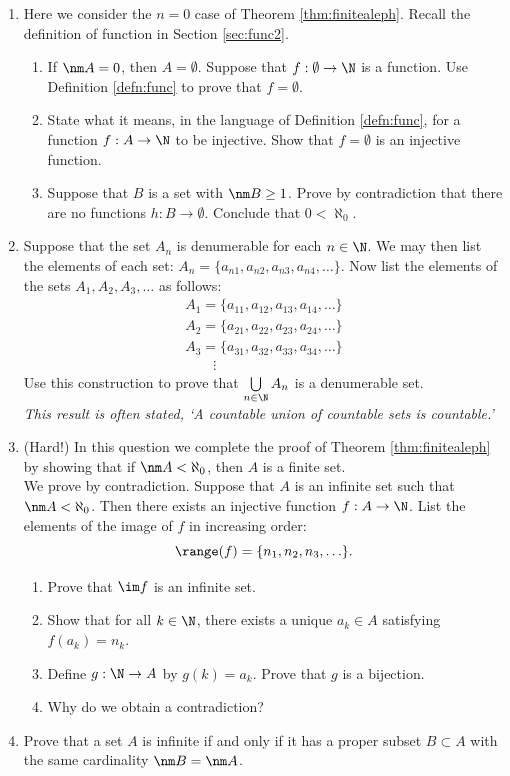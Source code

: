 \begin{enumerate}
	\item Here we consider the $n=0$ case of Theorem \ref{thm:finitealeph}. Recall the definition of function in Section \ref{sec:func2}.
  \begin{enumerate}
    \item If $\nm A=0$, then $A=\emptyset$. Suppose that $f:\emptyset\to\N$ is a function. Use Definition \ref{defn:func} to prove that $f=\emptyset$.
    \item State what it means, in the language of Definition \ref{defn:func}, for a function $f:A\to\N$ to be injective. Show that $f=\emptyset$ is an injective function.
    \item Suppose that $B$ is a set with $\nm B\ge 1$. Prove by contradiction that there are no functions $h:B\to\emptyset$. Conclude that $0<\aleph_0$.
  \end{enumerate}

	\item\label{ex:cardunion} Suppose that the set $A_n$ is denumerable for each $n\in\N$. We may then list the elements of each set: $A_n=\{a_{n1},a_{n2},a_{n3},a_{n4},\ldots\}$. Now list the elements of the sets $A_1,A_2,A_3,\ldots$ as follows:
	\begin{gather*}
		A_1=\{a_{11},a_{12},a_{13},a_{14},\ldots\}\\
		A_2=\{a_{21},a_{22},a_{23},a_{24},\ldots\}\\
		A_3=\{a_{31},a_{32},a_{33},a_{34},\ldots\}\\
		\qquad\vdots
	\end{gather*}
	Use this construction to prove that $\bigcup\limits_{n\in\N}A_n$ is a denumerable set.\\
	\emph{This result is often stated, `A countable union of countable sets is countable.'}
	
	\item(Hard!) In this question we complete the proof of Theorem \ref{thm:finitealeph} by showing that if $\nm A<\aleph_0$, then $A$ is a finite set.\\[2pt]
	We prove by contradiction. Suppose that $A$ is an infinite set such that $\nm A<\aleph_0$. Then there exists an injective function $f:A\to\N$. List the elements of the image of $f$ in increasing order:
	  \[\range(f)=\{n_1,n_2,n_3,\ldots\}.\]
	\begin{enumerate}
	  \item Prove that $\im f$ is an infinite set.
	  \item Show that for all $k\in\N$, there exists a unique $a_k\in A$ satisfying $f(a_k)=n_k$.
	  \item Define $g:\N\to A$ by $g(k)=a_k$. Prove that $g$ is a bijection.
	  \item Why do we obtain a contradiction?
	\end{enumerate}
	
	\item\label{ex:cardinf} Prove that a set $A$ is infinite if and only if it has a proper subset $B\subset A$ with the same cardinality $\nm B=\nm A$.
\end{enumerate}
\newpage

